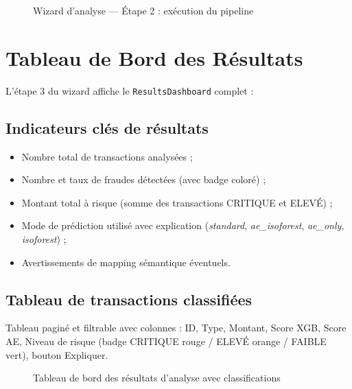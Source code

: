 \documentclass[12pt,a4paper,twoside]{report}
\theoremstyle{definition}
\begin{document}
\begin{figure}[H]
\centering
{}
\caption{Wizard d'analyse — Étape 2 : exécution du pipeline}
\label{fig:ui_wizard_step2}
\end{figure}

\section{Tableau de Bord des Résultats}

L'étape 3 du wizard affiche le \texttt{ResultsDashboard} complet :

\subsection{Indicateurs clés de résultats}

\begin{itemize}
  \item Nombre total de transactions analysées ;
  \item Nombre et taux de fraudes détectées (avec badge coloré) ;
  \item Montant total à risque (somme des transactions CRITIQUE et ELEVÉ) ;
  \item Mode de prédiction utilisé avec explication (\textit{standard},
    \textit{ae\_isoforest}, \textit{ae\_only}, \textit{isoforest}) ;
  \item Avertissements de mapping sémantique éventuels.
\end{itemize}

\subsection{Tableau de transactions classifiées}

Tableau paginé et filtrable avec colonnes : ID, Type, Montant, Score XGB,
Score AE, Niveau de risque (badge CRITIQUE rouge / ELEVÉ orange / FAIBLE vert),
bouton Expliquer.

\begin{figure}[H]
\centering
{}
\caption{Tableau de bord des résultats d'analyse avec classifications}
\label{fig:ui_results}
\end{figure}
\end{document}
